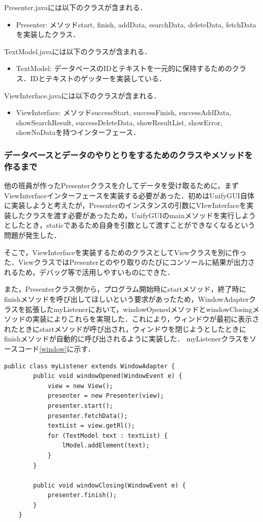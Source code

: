 \documentclass[12pt]{jarticle}
\begin{document}
Presenter.javaには以下のクラスが含まれる．
\begin{itemize}
\item Presenter: メソッドstart, finish, addData, searchData, deleteData, fetchDataを実装したクラス．
\end{itemize}

TextModel.javaには以下のクラスが含まれる．
\begin{itemize}
\item TextModel: データベースのIDとテキストを一元的に保持するためのクラス．IDとテキストのゲッターを実装している．
\end{itemize}

ViewInterface.javaには以下のクラスが含まれる．
\begin{itemize}
\item ViewInterface: メソッドsuccessStart, successFinish, successAddData, showSearchResult, successDeleteData, showResultList, showError, showNoDataを持つインターフェース．
\end{itemize}

\subsubsection{データベースとデータのやりとりをするためのクラスやメソッドを作るまで}
他の班員が作ったPresenterクラスを介してデータを受け取るために，まずViewInterfaceインターフェースを実装する必要があった．初めはUnifyGUI自体に実装しようと考えたが，Presenterのインスタンスの引数にVIewInterfaceを実装したクラスを渡す必要があったため，UnifyGUIのmainメソッドを実行しようとしたとき，staticであるため自身を引数として渡すことができなくなるという問題が発生した．

そこで，ViewInterfaceを実装するためのクラスとしてViewクラスを別に作った．ViewクラスではPresenterとのやり取りのたびにコンソールに結果が出力されるため，デバッグ等で活用しやすいものにできた．

また，Presenterクラス側から，プログラム開始時にstartメソッド，終了時にfinishメソッドを呼び出してほしいという要求があったため，WindowAdapterクラスを拡張したmyListenerにおいて，windowOpenedメソッドとwindowClosingメソッドの実装によりこれらを実現した．これにより，ウィンドウが最初に表示されたときにstartメソッドが呼び出され，ウィンドウを閉じようとしたときにfinishメソッドが自動的に呼び出されるように実装した．
myListenerクラスをソースコード\ref{window}に示す．

\begin{lstlisting}[caption=myListenerクラス, label=window]
    public class myListener extends WindowAdapter {
        public void windowOpened(WindowEvent e) {
            view = new View();
            presenter = new Presenter(view);
            presenter.start();
            presenter.fetchData();
            textList = view.getRl();
            for (TextModel text : textList) {
                lModel.addElement(text);
            }
        }

        public void windowClosing(WindowEvent e) {
            presenter.finish();
        }
    }
\end{lstlisting}
\end{document}
